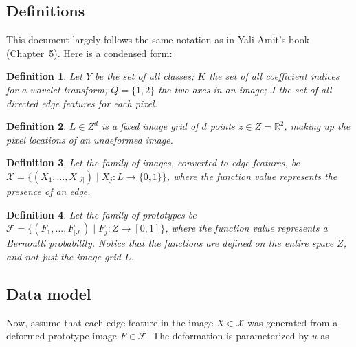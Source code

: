 \documentclass{report}
\newtheorem{mydef}{Definition}
\begin{document}
\subsection{Definitions}

This document largely follows the same notation as in Yali Amit's book (Chapter~5). Here is a condensed form: 

\begin{mydef}
Let $Y$ be the set of all classes; $K$ the set of all coefficient indices for a wavelet transform; $Q = \{1,2\}$ the two axes in an image; $J$ the set of all directed edge features for each pixel.%
\end{mydef}

\begin{mydef}
$L \in Z^{d}$ is a fixed image grid of $d$ points $z \in Z = \mathbb{R}^2$, making up the pixel locations of an undeformed image. %
\end{mydef}

\begin{mydef}
Let the family of images, converted to edge features, be $\mathcal{X} = \{ (X_1, \dots, X_{|J|}) \mid X_j : L \rightarrow \{0,1\}\}$, where the function value represents the presence of an edge.%
\end{mydef}

\begin{mydef}
Let the family of prototypes be $\mathcal{F} = \{ (F_1, \dots, F_{|J|}) \mid F_j : Z \rightarrow [0, 1]\}$, where the function value represents a Bernoulli probability. Notice that the functions are defined on the entire space $Z$, and not just the image grid $L$.
\end{mydef}


\subsection{Data model}
Now, assume that each edge feature in the image $X \in \mathcal{X}$ was generated from a deformed prototype image $F \in \mathcal{F}$. The deformation is parameterized by $u$ as
\end{document}
